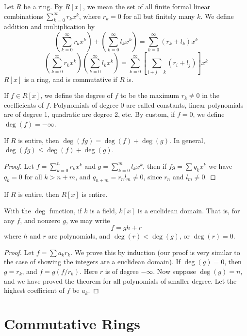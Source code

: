 Let $R$ be a ring. By $R[x]$, we mean the set of all finite formal linear combinations $\sum_{k = 0}^\infty r_k x^k$, where $r_k = 0$ for all but finitely many $k$. We define addition and multiplication by
%
\[ \left( \sum_{k = 0}^\infty r_kx^k \right) + \left( \sum_{k = 0}^\infty l_kx^k \right) = \sum_{k = 0}^\infty (r_k + l_k)x^k \]
%
\[ \left( \sum_{k = 0}^\infty r_kx^k \right) \left( \sum_{k = 0}^\infty l_kx^k \right) = \sum_{k = 0}^\infty \left[ \sum_{i + j = k} (r_i + l_j) \right] x^k \]
%
$R[x]$ is a ring, and is commutative if $R$ is.

If $f \in R[x]$, we define the degree of $f$ to be the maximum $r_k \neq 0$ in the coefficients of $f$. Polynomials of degree 0 are called constants, linear polynomials are of degree 1, quadratic are degree 2, etc. By custom, if $f = 0$, we define $\deg(f) = -\infty$.

\begin{theorem}
    If $R$ is entire, then $\deg(fg) = \deg(f) + \deg(g)$. In general, $\deg(fg) \leq \deg(f) + \deg(g)$.
\end{theorem}
\begin{proof}
    Let $f = \sum_{k = 0}^n r_kx^k$ and $g = \sum_{k = 0}^m l_kx^k$, then if $fg = \sum q_kx^k$ we have $q_k = 0$ for all $k > n + m$, and $q_{n + m} = r_nl_m \neq 0$, since $r_n$ and $l_m \neq 0$.
\end{proof}

\begin{corollary}
    If $R$ is entire, then $R[x]$ is entire.
\end{corollary}

\begin{theorem}
    With the $\deg$ function, if $k$ is a field, $k[x]$ is a euclidean domain. That is, for any $f$, and nonzero $g$, we may write
    \[ f = gh + r \]
    where $h$ and $r$ are polynomials, and $\deg(r) < \deg(g)$, or $\deg(r) = 0$.
\end{theorem}
\begin{proof}
    Let $f = \sum a_kr_k$. We prove this by induction (our proof is very similar to the case of showing the integers are a euclidean domain). If $\deg(g) = 0$, then $g = r_k$, and $f = g(f/r_k)$. Here $r$ is of degree $-\infty$. Now suppose $\deg(g) = n$, and we have proved the theorem for all polynomials of smaller degree. Let the highest coefficient of $f$ be $a_k$.
\end{proof}



\section{Commutative Rings}

